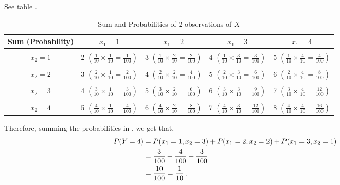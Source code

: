 \begin{subquestions}
\begin{subsubquestions}
\subsubquestion

See table .

\begin{table}[H]
	\centering
	\begin{tabular}{|c|c|c|c|c|}
		\hline
		 Sum (Probability) & $x_1=1$ & $x_1=2$ & $x_1=3$ & $x_1=4$ \\
		\hline 
		& & & &\\
		$x_2=1$ & 2 $\left(\frac{1}{10} \times \frac{1}{10}=\frac{1}{100}\right)$ & 3 $\left(\frac{1}{10} \times \frac{2}{10}=\frac{2}{100}\right)$ & 4 $\left(\frac{1}{10} \times \frac{3}{10}=\frac{3}{100}\right)$ & 5 $\left(\frac{1}{10} \times \frac{4}{10}=\frac{4}{100}\right)$ \\ & & & & \\
		
		$x_2=2$ & 3 $\left(\frac{2}{10} \times \frac{1}{10}=\frac{2}{100}\right)$ & 4 $\left(\frac{2}{10} \times \frac{2}{10}=\frac{4}{100}\right)$ & 5 $\left(\frac{2}{10} \times \frac{3}{10}=\frac{6}{100}\right)$ & 6 $\left(\frac{2}{10} \times \frac{4}{10}=\frac{8}{100}\right)$ \\ & & & & \\
		
		$x_2=3$ & 4 $\left(\frac{3}{10} \times \frac{1}{10}=\frac{3}{100}\right)$ & 5 $\left(\frac{3}{10} \times \frac{2}{10}=\frac{6}{100}\right)$ & 6 $\left(\frac{3}{10} \times \frac{3}{10}=\frac{9}{100}\right)$ & 7 $\left(\frac{3}{10} \times \frac{4}{10}=\frac{12}{100}\right)$ \\ & & & & \\
		
		$x_2=4$ & 5 $\left(\frac{4}{10} \times \frac{1}{10}=\frac{4}{100}\right)$ & 6 $\left(\frac{4}{10} \times \frac{2}{10}=\frac{8}{100}\right)$ & 7 $\left(\frac{4}{10} \times \frac{3}{10}=\frac{12}{100}\right)$ & 8 $\left(\frac{4}{10} \times \frac{4}{10}=\frac{16}{100}\right)$ \\
		\hline
	\end{tabular}
	\caption{\label{2008J:q4:Ytab} Sum and Probabilities of 2 observations of $X$}	
\end{table}

Therefore, summing the probabilities in , we get that,
\begin{align}
	P(Y=4) & = P(x_1=1,x_2=3)+P(x_1=2,x_2=2)+P(x_1=3,x_2=1) \nonumber \\
	       & = \frac{3}{100}+\frac{4}{100}+\frac{3}{100} \nonumber \\
	       & = \frac{10}{100} = \frac{1}{10} \,. \label{2008J:q4:Yeqn}
\end{align} 
	

\end{subsubquestions}
\end{subquestions}
